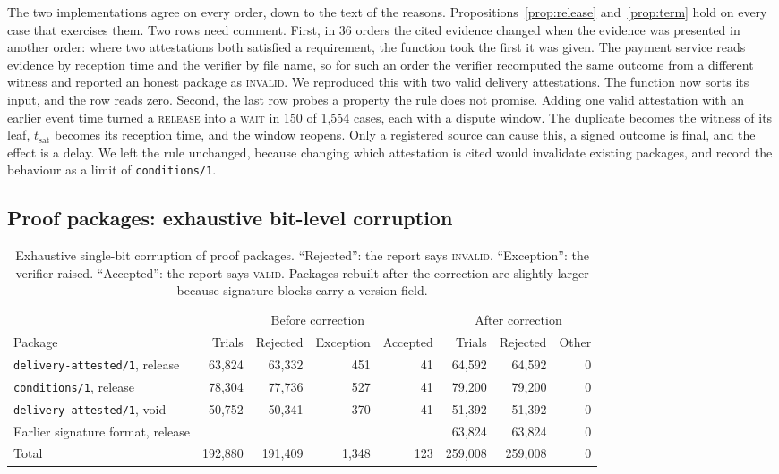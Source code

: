 \documentclass[10pt,a4paper]{article}
\newcommand{\code}[1]{\texttt{\small #1}}
\newcommand{\rel}{\textup{\textsc{release}}}
\newcommand{\wait}{\textup{\textsc{wait}}}
\theoremstyle{tight}
\begin{document}
The two implementations agree on every order, down to the text of the reasons. Propositions~\ref{prop:release}
and~\ref{prop:term} hold on every case that exercises them. Two rows need comment. First, in 36 orders the cited
evidence changed when the evidence was presented in another order: where two attestations both satisfied a
requirement, the function took the first it was given. The payment service reads evidence by reception time and the
verifier by file name, so for such an order the verifier recomputed the same outcome from a different witness and
reported an honest package as \textsc{invalid}. We reproduced this with two valid delivery attestations. The
function now sorts its input, and the row reads zero. Second, the last row probes a property the rule does not
promise. Adding one valid attestation with an earlier event time turned a \rel{} into a \wait{} in 150 of 1,554
cases, each with a dispute window. The duplicate becomes the witness of its leaf, $t_{\mathrm{sat}}$ becomes its
reception time, and the window reopens. Only a registered source can cause this, a signed outcome is final, and the
effect is a delay. We left the rule unchanged, because changing which attestation is cited would invalidate existing
packages, and record the behaviour as a limit of \code{conditions/1}.


\subsection{Proof packages: exhaustive bit-level corruption}\label{sec:tamper}

\begin{table}[t]
\centering\small
\caption{Exhaustive single-bit corruption of proof packages. ``Rejected'': the report says \textsc{invalid}.
``Exception'': the verifier raised. ``Accepted'': the report says \textsc{valid}. Packages rebuilt after the
correction are slightly larger because signature blocks carry a version field.}
\label{tab:tamper}
\begin{tabular}{@{}lrrrrrrr@{}}
\toprule
 & \multicolumn{4}{c}{Before correction} & \multicolumn{3}{c}{After correction} \\
\cmidrule(lr){2-5}\cmidrule(l){6-8}
Package & Trials & Rejected & Exception & Accepted & Trials & Rejected & Other \\
\midrule
\code{delivery-attested/1}, release & 63,824 & 63,332 & 451 & 41 & 64,592 & 64,592 & 0 \\
\code{conditions/1}, release & 78,304 & 77,736 & 527 & 41 & 79,200 & 79,200 & 0 \\
\code{delivery-attested/1}, void & 50,752 & 50,341 & 370 & 41 & 51,392 & 51,392 & 0 \\
Earlier signature format, release & & & & & 63,824 & 63,824 & 0 \\
\midrule
Total & 192,880 & 191,409 & 1,348 & 123 & 259,008 & 259,008 & 0 \\
\bottomrule
\end{tabular}
\end{table}
\end{document}
